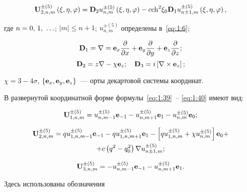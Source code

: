\begin{equation}\label{eq:1:40}
{\bf{U}}_{2,n,m}^{ \pm (5)}\left( {\xi ,\eta ,\varphi } \right) = {{\bf{D}}_2}u_{n,m}^{ \pm (5)}\left( {\xi ,\eta ,\varphi } \right) - c{{\mathop{\rm ch}\nolimits} ^2}{\xi _0}{{\bf{D}}_1}u_{n \pm 1,m}^{ \pm (5)}\left( {\xi ,\eta ,\varphi } \right),
\end{equation}

\noindent где $n = 0,{\mkern 1mu} {\kern 1pt} 1,{\mkern 1mu} {\kern 1pt}  \ldots $; $|m| \le n + 1$; $u_{n,m}^{ \pm (5)}$ определены в~\eqref{eq:1:6};

\begin{equation*}
{{\bf{D}}_1} = \nabla  = {{\bf{e}}_x}\frac{\partial }{{\partial x}} + {{\bf{e}}_y}\frac{\partial }{{\partial y}} + {{\bf{e}}_z}\frac{\partial }{{\partial z}};
\end{equation*}
\begin{equation}\label{eq:1:41}
{{\bf{D}}_2} = z\nabla  - \chi {{\bf{e}}_z};\quad {{\bf{D}}_3} = i\left[ {\nabla  \times {{\bf{e}}_z}} \right];
\end{equation}

\noindent $\chi  = 3 - 4\sigma $, $\left\{ {{{\bf{e}}_x},{{\bf{e}}_y},{{\bf{e}}_z}} \right\}$~--- орты декартовой системы координат.

В развернутой координатной форме формулы~\eqref{eq:1:39}~-- \eqref{eq:1:40} имеют вид:

\begin{equation}\label{eq:1:42}
{\bf{U}}_{1,n,m}^{ \pm (5)} = u_{n,m - 1}^{ \pm (5)}{{\bf{e}}_{ - 1}} - u_{n,m + 1}^{ \pm (5)}{{\bf{e}}_1} - u_{n,m}^{ \pm (5)}{{\bf{e}}_0};
\end{equation}

\begin{multline}\label{eq:1:43}
{\bf{U}}_{2,n,m}^{ \pm (5)} = qu_{1,n,m - 1}^{ \pm (5)}{{\bf{e}}_{ - 1}} - qu_{1,n,m + 1}^{ \pm (5)}{{\bf{e}}_1} - \left[ {qu_{1,n,m}^{ \pm (5)} + \chi u_{n,m}^{ \pm (5)}} \right]{{\bf{e}}_0} + \\
+ c\left( {{q^2} - q_0^2} \right)\nabla u_{n \pm 1,m}^{ \pm (5)};
\end{multline}

\begin{equation}\label{eq:1:44}
{\bf{U}}_{3,n,m}^{ \pm (5)} =  - u_{n,m - 1}^{ \pm (5)}{{\bf{e}}_{ - 1}} - u_{n,m + 1}^{ \pm (5)}{{\bf{e}}_1}.
\end{equation}

Здесь использованы обозначения


